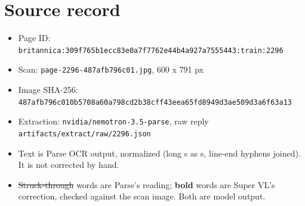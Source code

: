 \documentclass[10pt]{article}
\begin{document}
\section*{Source record}
\begin{itemize}
\item Page ID: \texttt{britannica:309f765b1ecc83e0a7f7762e44b4a927a7555443:train:2296}
\item Scan: \texttt{page-2296-487afb796c01.jpg}, 600 x 791 px
\item Image SHA-256: \texttt{\small 487afb796c010b5708a60a798cd2b38cff43eea65fd8949d3ae509d3a6f63a13}
\item Extraction: \texttt{nvidia/nemotron-3.5-parse}, raw reply \texttt{artifacts/extract/raw/2296.json}
\item Text is Parse OCR output, normalized (long s as s, line-end hyphens joined). It is not corrected by hand.
\item \sout{Struck-through} words are Parse's reading; \textbf{bold} words are Super VL's correction, checked against the scan image. Both are model output.
\end{itemize}
\end{document}
